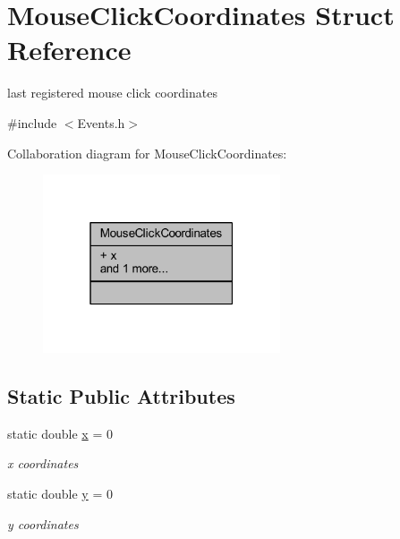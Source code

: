 \hypertarget{struct_mouse_click_coordinates}{}\section{Mouse\+Click\+Coordinates Struct Reference}
\label{struct_mouse_click_coordinates}


last registered mouse click coordinates  




{\ttfamily \#include $<$Events.\+h$>$}



Collaboration diagram for Mouse\+Click\+Coordinates\+:\nopagebreak
\begin{figure}[H]
\begin{center}
\leavevmode
\includegraphics[width=199pt]{struct_mouse_click_coordinates__coll__graph}
\end{center}
\end{figure}
\subsection*{Static Public Attributes}
\begin{DoxyCompactItemize}
\item 
\mbox{\label{struct_mouse_click_coordinates_ae2d7c0c719bbe09164c3650819dae696}} 
static double \hyperlink{struct_mouse_click_coordinates_ae2d7c0c719bbe09164c3650819dae696}{x} = 0
\begin{DoxyCompactList}\small\item\em x coordinates \end{DoxyCompactList}\item 
\mbox{\label{struct_mouse_click_coordinates_a093e1fd64d4009d358b00c1e58f20997}} 
static double \hyperlink{struct_mouse_click_coordinates_a093e1fd64d4009d358b00c1e58f20997}{y} = 0
\begin{DoxyCompactList}\small\item\em y coordinates \end{DoxyCompactList}\end{DoxyCompactItemize}


